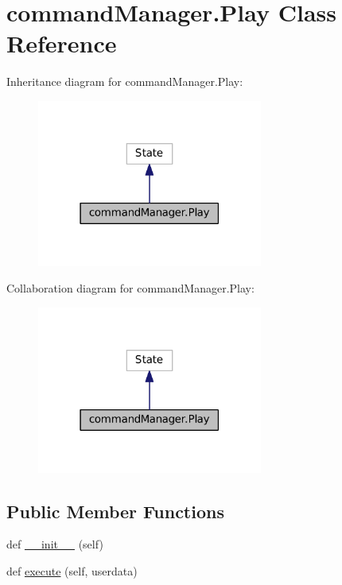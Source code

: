 \hypertarget{classcommandManager_1_1Play}{}\section{command\+Manager.\+Play Class Reference}
\label{classcommandManager_1_1Play}


Inheritance diagram for command\+Manager.\+Play\+:\nopagebreak
\begin{figure}[H]
\begin{center}
\leavevmode
\includegraphics[width=210pt]{classcommandManager_1_1Play__inherit__graph}
\end{center}
\end{figure}


Collaboration diagram for command\+Manager.\+Play\+:\nopagebreak
\begin{figure}[H]
\begin{center}
\leavevmode
\includegraphics[width=210pt]{classcommandManager_1_1Play__coll__graph}
\end{center}
\end{figure}
\subsection*{Public Member Functions}
\begin{DoxyCompactItemize}
\item 
def \hyperlink{classcommandManager_1_1Play_a4bc5c3700d80432b4dd09b163f210540}{\+\_\+\+\_\+init\+\_\+\+\_\+} (self)
\item 
def \hyperlink{classcommandManager_1_1Play_a2ec6a287ce47f3f6c08c76cc452cf4d3}{execute} (self, userdata)
\end{DoxyCompactItemize}

